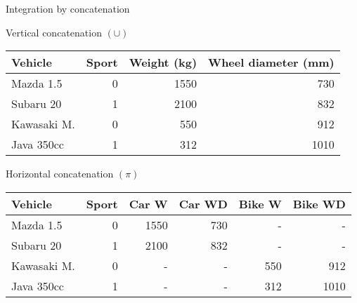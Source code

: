 \documentclass[hyperref={colorlinks=true}]{beamer}
\begin{document}
\begin{frame}{Integration by concatenation}
  \begin{block}{Vertical concatenation $(\cup)$}
    \begin{tabular}{l|r|rr}
    Vehicle & Sport & Weight (kg) & Wheel diameter (mm) \\
    \hline
    Mazda 1.5   & 0 & 1550 & 730 \\
    Subaru 20   & 1 & 2100 & 832 \\
    Kawasaki M. & 0 &  550 & 912 \\
    Java 350cc  & 1 &  312 & 1010 \\
    \hline
    \end{tabular}
  \end{block}
  \begin{block}{Horizontal concatenation $(\pi)$}
    \begin{tabular}{l|r|rrrr}
    Vehicle & Sport & Car W & Car WD & Bike W & Bike WD \\
    \hline
    Mazda 1.5   & 0 & 1550 & 730 &   - &    - \\
    Subaru 20   & 1 & 2100 & 832 &   - &    - \\
    Kawasaki M. & 0 &    - &   - & 550 &  912 \\
    Java 350cc  & 1 &    - &   - & 312 & 1010 \\
    \hline
    \end{tabular}
  \end{block}
\end{frame}
\end{document}
